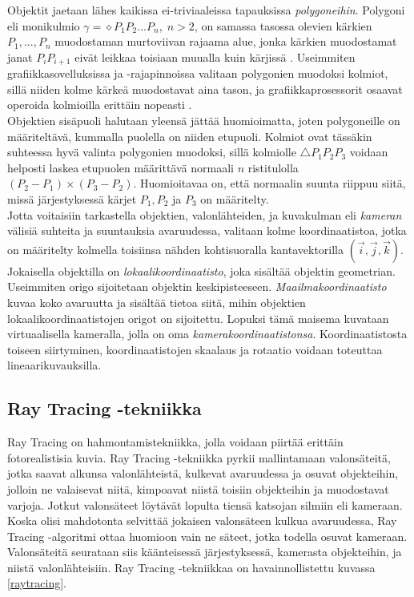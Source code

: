 \documentclass[a4paper, 12pt, titlepage]{article}
\begin{document}
Objektit jaetaan lähes kaikissa ei-triviaaleissa tapauksissa \emph{polygoneihin}. Polygoni eli monikulmio $\gamma = \diamond P_1P_2...P_n, \; n > 2$, on samassa tasossa olevien kärkien $P_1,...,P_n$ muodostaman murtoviivan rajaama alue, jonka kärkien muodostamat janat $P_i P_{i+1}$ eivät leikkaa toisiaan muualla kuin kärjissä \citep{harju}. Useimmiten grafiikkasovelluksissa ja -rajapinnoissa valitaan polygonien muodoksi kolmiot, sillä niiden kolme kärkeä muodostavat aina tason, ja grafiikkaprosessorit osaavat operoida kolmioilla erittäin nopeasti \citep{angel}.\\

Objektien sisäpuoli halutaan yleensä jättää huomioimatta, joten polygoneille on määriteltävä, kummalla puolella on niiden etupuoli. Kolmiot ovat tässäkin suhteessa hyvä valinta polygonien muodoksi, sillä kolmiolle $\triangle P_1P_2P_3$ voidaan helposti laskea etupuolen määrittävä normaali $n$ ristitulolla $(P_2-P_1) \times (P_3-P_2)$. Huomioitavaa on, että normaalin suunta riippuu siitä, missä järjestyksessä kärjet $P_1, P_2$ ja $P_3$ on määritelty. \citep[.]{hughes}\\

Jotta voitaisiin tarkastella objektien, valonlähteiden, ja kuvakulman eli \emph{kameran} välisiä suhteita ja suuntauksia avaruudessa, valitaan kolme koordinaatistoa, jotka on määritelty kolmella toisiinsa nähden kohtisuoralla kantavektorilla $(\vec{i},\vec{j},\vec{k})$. Jokaisella objektilla on \emph{lokaalikoordinaatisto}, joka sisältää objektin geometrian. Useimmiten origo sijoitetaan objektin keskipisteeseen. \emph{Maailmakoordinaatisto} kuvaa koko avaruutta ja sisältää tietoa siitä, mihin objektien lokaalikoordinaatistojen origot on sijoitettu. Lopuksi tämä maisema kuvataan virtuaalisella kameralla, jolla on oma \emph{kamerakoordinaatistonsa}. Koordinaatistosta toiseen siirtyminen, koordinaatistojen skaalaus ja rotaatio voidaan toteuttaa lineaarikuvauksilla. \citep[.]{janke}

\subsection{Ray Tracing -tekniikka}

Ray Tracing on hahmontamistekniikka, jolla voidaan piirtää erittäin fotorealistisia kuvia. Ray Tracing -tekniikka pyrkii mallintamaan valonsäteitä, jotka saavat alkunsa valonlähteistä, kulkevat avaruudessa ja osuvat objekteihin, jolloin ne valaisevat niitä, kimpoavat niistä toisiin objekteihin ja muodostavat varjoja. Jotkut valonsäteet löytävät lopulta tiensä katsojan silmiin eli kameraan. Koska olisi mahdotonta selvittää jokaisen valonsäteen kulkua avaruudessa, Ray Tracing -algoritmi ottaa huomioon vain ne säteet, jotka todella osuvat kameraan. Valonsäteitä seurataan siis käänteisessä järjestyksessä, kamerasta objekteihin, ja niistä valonlähteisiin. Ray Tracing -tekniikkaa on havainnollistettu kuvassa \ref{raytracing}. \citep[.]{janke}\\
\end{document}
